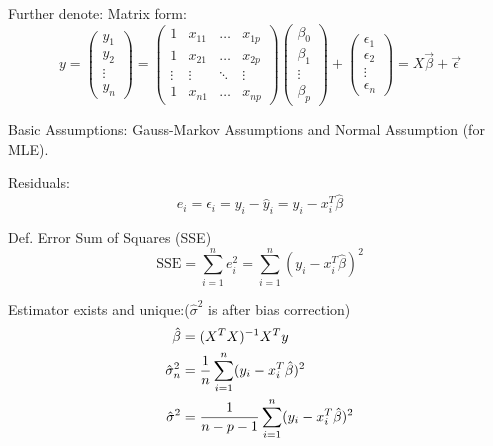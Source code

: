     Further denote: Matrix form:
    \begin{equation}\label{EqaMatrixRepreOfSSE}
        y=\begin{pmatrix}
            y_1\\
            y_2\\
            \vdots\\
            y_n
        \end{pmatrix}  
        =
        \begin{pmatrix}
            1&x_{11}&\ldots&x_{1p}\\
            1&x_{21}&\ldots&x_{2p}\\
            \vdots&\vdots&\ddots&\vdots\\
            1&x_{n1}&\ldots&x_{np}
        \end{pmatrix}
        \begin{pmatrix}
            \beta_0\\
            \beta_1\\
            \vdots\\
            \beta_p
        \end{pmatrix}
        +
        \begin{pmatrix}
            \epsilon_1\\
            \epsilon_2\\
            \vdots\\
            \epsilon_n
        \end{pmatrix}
        =X\vec{\beta}+\vec{\epsilon}
    \end{equation}

    Basic Assumptions: Gauss-Markov Assumptions and Normal Assumption (for MLE).
    


    Residuals:
    \begin{equation}e_i=\hat{\epsilon}_i=y_i-\hat{y}_i=y_i-x_i^T\hat{\beta }\end{equation}

    Def. Error Sum of Squares (SSE)
    \begin{equation}\mathrm{SSE}=\sum_{i=1}^ne_i^2=\sum_{i=1}^n(y_i-x_i^T\hat{\beta })^2\end{equation}

    Estimator exists and unique:($\hat{\sigma}^2$ is after bias correction)
    \begin{align}
        \hat{\beta}&=(X^TX)^{-1}X^Ty\notag \\
        \hat{\sigma}_n^2&=\frac{1}{n}\sum_{i=1}^n(y_i-x^T_i\hat{\beta})^2 \notag\\ 
        \hat{\sigma}^2&=\frac{1}{n-p-1}\sum_{i=1}^n(y_i-x_i^T\hat{\beta})^2\label{EqaEstimatorSigmaWithDoF}
    \end{align}

